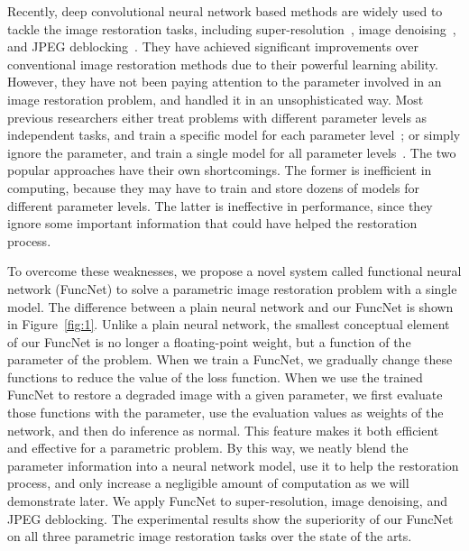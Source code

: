 \documentclass{article}
\begin{document}
Recently, deep convolutional neural network based methods are widely used to tackle the image restoration tasks, including super-resolution~\cite{dong2014learning,kim2016accurate,shi2016real,lim2017enhanced,tai2017image,tong2017image,zhang2018residual,zhang2018image,dai2019second,niu2020single}, image denoising~\cite{jain2008natural,burger2012image,zhang2017learning,lefkimmiatis2017non,tai2017memnet,zhang2017beyond,zhang2018ffdnet,yu2019deep,anwar2019real}, and JPEG deblocking~\cite{liu2015data,dong2015compression,wang2016d3,guo2016building,cavigelli2017cas,galteri2017deep,liu2018multi,zhang2018dmcnn,ehrlich2020quantization}. They have achieved significant improvements over conventional image restoration methods due to their powerful learning ability. However, they have not been paying attention to the parameter involved in an image restoration problem, and handled it in an unsophisticated way. Most previous researchers either treat problems with different parameter levels as independent tasks, and train a specific model for each parameter level~\cite{dong2014learning,shi2016real,zhang2018image,zhang2017beyond,zhang2018dmcnn}; or simply ignore the parameter, and train a single model for all parameter levels~\cite{kim2016accurate,yu2019deep}. The two popular approaches have their own shortcomings. The former is inefficient in computing, because they may have to train and store dozens of models for different parameter levels. The latter is ineffective in performance, since they ignore some important information that could have helped the restoration process.

To overcome these weaknesses, we propose a novel system called functional neural network (FuncNet) to solve a parametric image restoration problem with a single model. The difference between a plain neural network and our FuncNet is shown in Figure~\ref{fig:1}. Unlike a plain neural network, the smallest conceptual element of our FuncNet is no longer a floating-point weight, but a function of the parameter of the problem. When we train a FuncNet, we gradually change these functions to reduce the value of the loss function. When we use the trained FuncNet to restore a degraded image with a given parameter, we first evaluate those functions with the parameter, use the evaluation values as weights of the network, and then do inference as normal. This feature makes it both efficient and effective for a parametric problem. By this way, we neatly blend the parameter information into a neural network model, use it to help the restoration process, and only increase a negligible amount of computation as we will demonstrate later. We apply FuncNet to super-resolution, image denoising, and JPEG deblocking. The experimental results show the superiority of our FuncNet on all three parametric image restoration tasks over the state of the arts.
\end{document}
